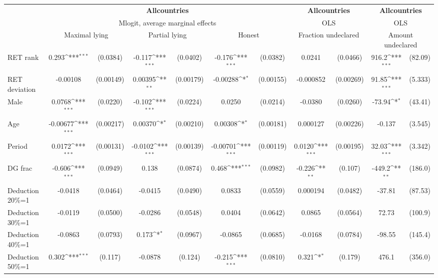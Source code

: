 \def\sym#1{\ifmmode^{#1}\else\(^{#1}\)\fi}
\begin{tabular}{l|cccccc|cc|cc}
\hline\hline
&\multicolumn{6}{c|}{\bf All\space{}countries}&\multicolumn{2}{c|}{\bf All\space{}countries}&\multicolumn{2}{c}{\bf All\space{}countries}\\ &\multicolumn{6}{c|}{Mlogit, average marginal effects }&\multicolumn{2}{c|}{OLS}&\multicolumn{2}{c}{OLS}\\
                &\multicolumn{2}{c}{Maximal lying}&\multicolumn{2}{c}{Partial lying}&\multicolumn{2}{c}{Honest}  &\multicolumn{2}{c}{Fraction undeclared}&\multicolumn{2}{c}{Amount undeclared}\\
\hline
RET rank        &    0.293\sym{***}& (0.0384)&   -0.117\sym{***}& (0.0402)&   -0.176\sym{***}& (0.0382)&   0.0241         & (0.0466)&    916.2\sym{***}&  (82.09)\\
RET deviation   & -0.00108         &(0.00149)&  0.00395\sym{**} &(0.00179)& -0.00288\sym{*}  &(0.00155)&-0.000852         &(0.00269)&    91.85\sym{***}&  (5.333)\\
Male            &   0.0768\sym{***}& (0.0220)&   -0.102\sym{***}& (0.0224)&   0.0250         & (0.0214)&  -0.0380         & (0.0260)&   -73.94\sym{*}  &  (43.41)\\
Age             & -0.00677\sym{***}&(0.00217)&  0.00370\sym{*}  &(0.00210)&  0.00308\sym{*}  &(0.00181)& 0.000127         &(0.00226)&   -0.137         &  (3.545)\\
Period          &   0.0172\sym{***}&(0.00131)&  -0.0102\sym{***}&(0.00139)& -0.00701\sym{***}&(0.00119)&   0.0120\sym{***}&(0.00195)&    32.03\sym{***}&  (3.342)\\
DG frac         &   -0.606\sym{***}& (0.0949)&    0.138         & (0.0874)&    0.468\sym{***}& (0.0982)&   -0.226\sym{**} &  (0.107)&   -449.2\sym{**} &  (186.0)\\
Deduction 20\%=1&  -0.0418         & (0.0464)&  -0.0415         & (0.0490)&   0.0833         & (0.0559)& 0.000194         & (0.0482)&   -37.81         &  (87.53)\\
Deduction 30\%=1&  -0.0119         & (0.0500)&  -0.0286         & (0.0548)&   0.0404         & (0.0642)&   0.0865         & (0.0564)&    72.73         &  (100.9)\\
Deduction 40\%=1&  -0.0863         & (0.0793)&    0.173\sym{*}  & (0.0967)&  -0.0865         & (0.0685)&  -0.0168         & (0.0784)&   -98.55         &  (145.4)\\
Deduction 50\%=1&    0.302\sym{***}&  (0.117)&  -0.0878         &  (0.124)&   -0.215\sym{***}& (0.0810)&    0.321\sym{*}  &  (0.179)&    476.1         &  (356.0)\\

\end{tabular}
